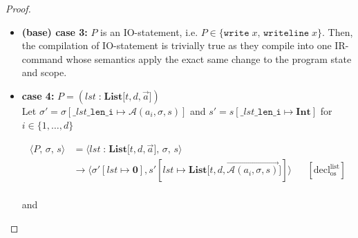 \documentclass{article}
\begin{document}
\begin{proof}
\begin{itemize}
    \[
      \begin{aligned}
      \langle P,\, \sigma,\, s \rangle
      &=\langle \texttt{pass},\, \sigma,\, s \rangle \\
      &\rightarrow \langle \sigma ,\, s \rangle
      && [ \text{pass}_{\text{os}} ] \\   
      \end{aligned}
  \]
  
  and

  \[
      \begin{aligned}
      \langle \mathcal{C}(P),\, e,\, \sigma,\, s,\, pc \rangle
      &= \langle \mathcal{C}(\texttt{pass}),\, e,\, \sigma,\, s,\, pc \rangle \\
      &= \langle \texttt{NOOP},\, e,\, \sigma,\, s,\, pc \rangle
      && \text{(definition of $\mathcal{C}$)} \\   
      &= \langle \epsilon,\, e,\, \sigma ,\, s,\, pc+1 \rangle
      && \text{(operational semantics)} \\ 
      \end{aligned}
  \]

    \item \textbf{(base) case 3:} $P$ is an IO-statement, i.e. $P \in \{ \texttt{write}\;x ,\, \texttt{writeline}\; x \}$. Then, the compilation of IO-statement is trivially true as they compile into one IR-command whose semantics apply the exact same change to the program state and scope.

    \item \textbf{case 4:} $P = (lst \;\texttt{:}\; \textbf{List[$t, d, \vec{a}$]})$\\

    Let $\sigma' = \sigma[\texttt{\_$lst$\_len\_i} \mapsto \mathcal{A}(a_i, \sigma, s)]$ and $s' = s[\texttt{\_$lst$\_len\_i} \mapsto \textbf{Int}]$ for $ i \in \{1,\dots,d\}$ 

        \[
          \begin{aligned}
          \langle P,\, \sigma,\, s \rangle
          &=\langle lst \;\texttt{:}\; \textbf{List[$t, d, \vec{a}$]},\, \sigma,\, s \rangle \\
          &\rightarrow \langle \sigma'[lst \mapsto \textbf{0}], s'[lst \mapsto \textbf{List[$t, d, \vec{\mathcal{A}(a_i, \sigma, s)}$]}] \rangle
          && [ \text{decl}^\text{list}_{\text{os}} ]\\   
          \end{aligned}
      \]
    
      and


\end{itemize}
\end{proof}
\end{document}
